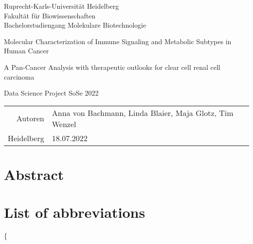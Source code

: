 \documentclass[
  parskip,
  oneside]{scrreprt}
\author{}
\date{\vspace{-2.5em}}
\begin{document}
\begin{titlepage}
\centering
    {\Large Ruprecht-Karls-Universität Heidelberg\\
        Fakultät für Biowissenschaften\\
        Bachelorstudiengang Molekulare Biotechnologie\\}

    {}
    {

        {\huge Molecular Characterization of Immune Signaling and Metabolic Subtypes in Human Cancer}

        {\Huge }
        
        {\LARGE A Pan-Cancer Analysis with therapeutic outlooks for clear cell renal cell carcinoma}

    }

    {\Large Data Science Project SoSe 2022}


    {\Large
        \begin{tabular}{rl}
            Autoren & Anna von Bachmann, Linda Blaier, Maja Glotz, Tim Wenzel\\
            Heidelberg &18.07.2022\\
        \end{tabular}
    }


\end{titlepage}

\hypertarget{abstract}{%
\chapter{Abstract}\label{abstract}}

\tableofcontents

\hypertarget{list-of-abbreviations}{%
\chapter{List of abbreviations}\label{list-of-abbreviations}}

\{\Large
\end{document}
